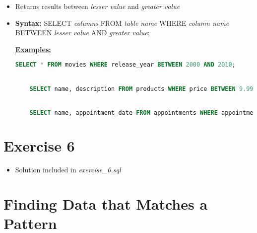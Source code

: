 \documentclass[12pt]{article}
\begin{document}
\bigskip

\begin{itemize}
    \item Returns results between \textit{lesser value} and \textit{greater value}
    \item \textbf{Syntax:} SELECT \textit{columns} FROM \textit{table name} WHERE \textit{column name} BETWEEN \textit{lesser value} AND \textit{greater value};

    \bigskip

    \underline{\textbf{Examples:}}

    \bigskip

    \begin{lstlisting}[language=SQL]
    SELECT * FROM movies WHERE release_year BETWEEN 2000 AND 2010;


    SELECT name, description FROM products WHERE price BETWEEN 9.99 AND 19.99;


    SELECT name, appointment_date FROM appointments WHERE appointment_date BETWEEN "2015-01-01" AND "2015-01-07";
    \end{lstlisting}
\end{itemize}

\bigskip

\section{Exercise 6}

\bigskip

\begin{itemize}
    \item Solution included in \textit{exercise\_6.sql}
\end{itemize}

\bigskip

\section{Finding Data that Matches a Pattern}

\bigskip
\end{document}
